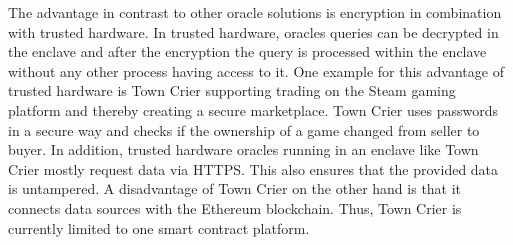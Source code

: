 \documentclass[conference]{IEEEtran}
\begin{document}
The advantage in contrast to other oracle solutions is encryption in combination with trusted hardware. In trusted hardware, oracles queries can be decrypted in the enclave and after the encryption the query is processed within the enclave without any other process having access to it. One example for this advantage of trusted hardware is Town Crier supporting trading on the Steam gaming platform and thereby creating a secure marketplace. Town Crier uses passwords in a secure way and checks if the ownership of a game changed from seller to buyer. In addition, trusted hardware oracles running in an enclave like Town Crier mostly request data via HTTPS. This also ensures that the provided data is untampered. A disadvantage of Town Crier on the other hand is that it connects data sources with the Ethereum blockchain. Thus, Town Crier is currently limited to one smart contract platform. \cite{Ellis2017} \cite{Zhang2016}
%
%

\end{document}
